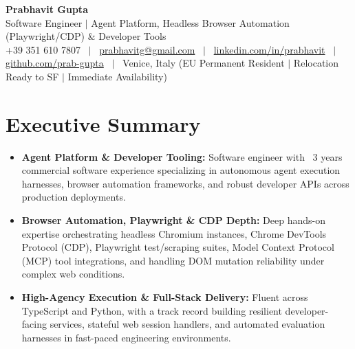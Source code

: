 \documentclass[a4paper,10pt]{article}
\begin{document}
\begin{minipage}[c]{0.80\textwidth}
  {\Huge\bfseries Prabhavit Gupta}\\[3pt]
  {\color{accent}\large Software Engineer $\vert$ Agent Platform, Headless Browser Automation (Playwright/CDP) $\&$ Developer Tools}\\[6pt]
  {\footnotesize +39 351 610 7807 ~$\vert$~
  \href{mailto:prabhavitg@gmail.com}{prabhavitg@gmail.com} ~$\vert$~
  \href{https://www.linkedin.com/in/prabhavit/}{linkedin.com/in/prabhavit} ~$\vert$~
  \href{https://github.com/prab-gupta}{github.com/prab-gupta} ~$\vert$~
  Venice, Italy (EU Permanent Resident $\vert$ Relocation Ready to SF $\vert$ Immediate Availability)}
\end{minipage}\hfill

\vspace{6pt}

\section{Executive Summary}
\begin{itemize}
  \item \textbf{Agent Platform \& Developer Tooling:} Software engineer with ~3 years commercial software experience specializing in autonomous agent execution harnesses, browser automation frameworks, and robust developer APIs across production deployments.
  \item \textbf{Browser Automation, Playwright \& CDP Depth:} Deep hands-on expertise orchestrating headless Chromium instances, Chrome DevTools Protocol (CDP), Playwright test/scraping suites, Model Context Protocol (MCP) tool integrations, and handling DOM mutation reliability under complex web conditions.
  \item \textbf{High-Agency Execution \& Full-Stack Delivery:} Fluent across TypeScript and Python, with a track record building resilient developer-facing services, stateful web session handlers, and automated evaluation harnesses in fast-paced engineering environments.
\end{itemize}

\end{document}
